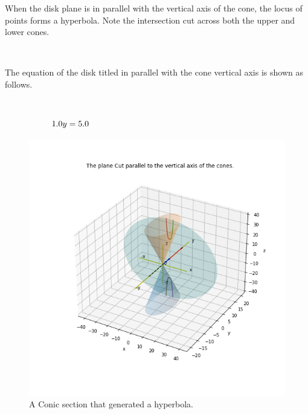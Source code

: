 \documentclass[10pt,a4paper,leqno]{article}
\begin{document}
\begin{CJK*}{UTF8}{gbsn}
\noindent When the disk plane is in parallel with the vertical axis of the cone,    the locus of points forms a hyperbola. Note the intersection cut across    both the upper and lower cones.
 \par \ \par\noindent The equation of the disk titled in parallel with the cone vertical axis is shown as follows.
 \par \ \par\begin{equation}
 \begin{minipage}{250pt}
                \begin{flushleft} $\displaystyle 1.0 y = 5.0$  \end{flushleft}
 \end{minipage}
 \end{equation}
\begin{figure}[H]
\centering\includegraphics[width=1\linewidth,height=0.7\textheight]{Data/fgr06.png}
\caption{A Conic section that generated a hyperbola. }
\label{fig:Data/fgr06.png}
\end{figure}


\end{CJK*}
\end{document}
